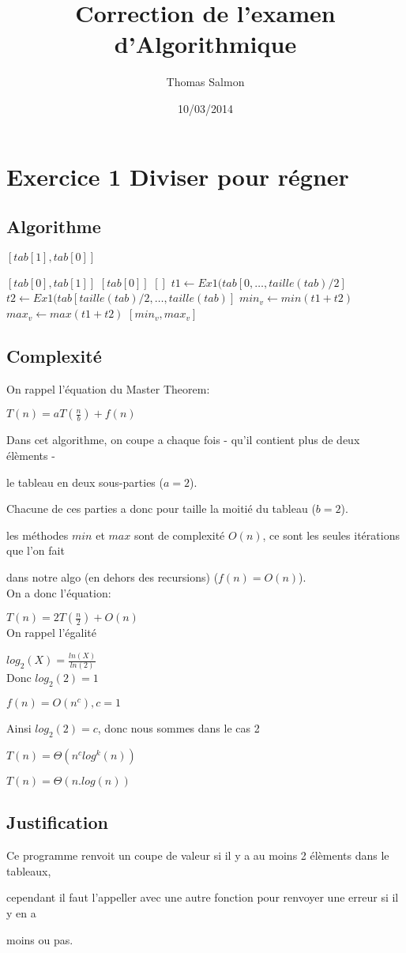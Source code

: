 \documentclass[a4paper]{article}
\title{Correction de l'examen d'Algorithmique}
\author{Thomas Salmon}
\date{10/03/2014}
\begin{document}
\maketitle
\section{Exercice 1 Diviser pour régner}
\subsection{Algorithme}
\begin{algorithmic}
	
		\State \Return $[tab[1], tab[0]]$
	\Else
	
		\State \Return $[tab[0], tab[1]]$
	\EndIf
{}
	\State \Return $[tab[0]]$
	\State \Return $[]$
\Else
\State $t1\gets Ex1(tab[0, \dots, taille(tab)/2]$
\State $t2\gets Ex1(tab[taille(tab)/2, \dots, taille(tab)]$
\State $min_v \gets  min(t1+t2)$
\State	$max_v \gets max(t1+t2)$
\State \Return $[min_v, max_v]$
\EndIf
\EndFunction
\end{algorithmic}
\subsection{Complexité}
On rappel l'équation du Master Theorem:

$T(n) = aT(\frac{n}{b}) + f(n)$

Dans cet algorithme, on coupe a chaque fois - qu'il contient plus de deux élèments - 

le tableau en deux sous-parties ($a = 2$).

Chacune de ces parties a donc pour taille la moitié du tableau ($b = 2$).

les méthodes $min$ et $max$ sont de complexité $O(n)$, ce sont les seules itérations que l'on fait 

dans notre algo (en dehors des recursions) ($f(n) = O(n)$).\\

On a donc l'équation: 

$T(n) = 2T(\frac{n}{2}) + O(n)$\\

On rappel l'égalité

$log_2(X) = \frac{ln(X)}{ln(2)}$\\

Donc $log_2(2) = 1$

$f(n) = O(n^c), c = 1$

Ainsi $log_2(2) = c$, donc nous sommes dans le cas 2

$T(n) = \Theta(n^c log^k(n))$

$T(n) = \Theta(n.log(n))$
\subsection{Justification}

Ce programme renvoit  un coupe de valeur si il y a au moins 2 élèments dans le tableaux, 

cependant il faut l'appeller avec une autre fonction pour renvoyer une erreur si il y en a 

moins ou pas.
\end{document}

